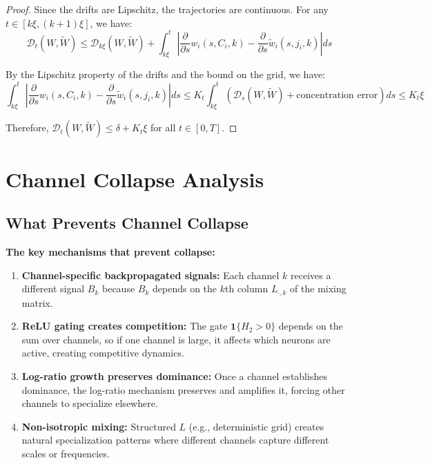 \documentclass[11pt]{article}
\newcommand{\1}{\mathbbm{1}}
\begin{document}
\begin{proof}
Since the drifts are Lipschitz, the trajectories are continuous. For any $t \in [k\xi, (k+1)\xi]$, we have:
\[
\mathscr{D}_t(W, \tilde{W}) \le \mathscr{D}_{k\xi}(W, \tilde{W}) + \int_{k\xi}^t \left|\frac{\partial}{\partial s}w_i(s, C_i, k) - \frac{\partial}{\partial s}\tilde{w}_i(s, j_i, k)\right| ds
\]

By the Lipschitz property of the drifts and the bound on the grid, we have:
\[
\int_{k\xi}^t \left|\frac{\partial}{\partial s}w_i(s, C_i, k) - \frac{\partial}{\partial s}\tilde{w}_i(s, j_i, k)\right| ds \le K_t \int_{k\xi}^t (\mathscr{D}_s(W, \tilde{W}) + \text{concentration error}) ds \le K_t\xi
\]

Therefore, $\mathscr{D}_t(W, \tilde{W}) \le \delta + K_t\xi$ for all $t \in [0, T]$.
\end{proof}

\section{Channel Collapse Analysis}

\subsection{What Prevents Channel Collapse}

\textbf{The key mechanisms that prevent collapse:}

\begin{enumerate}
\item \textbf{Channel-specific backpropagated signals:} Each channel $k$ receives a different signal $B_k$ because $B_k$ depends on the $k$th column $L_{\cdot,k}$ of the mixing matrix.

\item \textbf{ReLU gating creates competition:} The gate $\mathbf{1}\{H_2 > 0\}$ depends on the sum over channels, so if one channel is large, it affects which neurons are active, creating competitive dynamics.

\item \textbf{Log-ratio growth preserves dominance:} Once a channel establishes dominance, the log-ratio mechanism preserves and amplifies it, forcing other channels to specialize elsewhere.

\item \textbf{Non-isotropic mixing:} Structured $L$ (e.g., deterministic grid) creates natural specialization patterns where different channels capture different scales or frequencies.
\end{enumerate}
\end{document}
